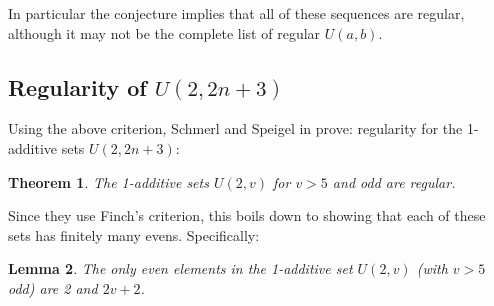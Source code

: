 \documentclass{report}
\newtheorem{theorem}{Theorem}[section]
\newtheorem{lemma}[theorem]{Lemma}
\theoremstyle{remark}
\numberwithin{equation}{section}
\begin{document}
In particular the conjecture implies that all of these sequences are
regular, although it may not be the complete list of regular $U(a,b)$.

\subsection{Regularity of $U(2,2n+3)$}

Using the above criterion, Schmerl and Speigel in
\cite{schmerl:jct1994} prove: regularity for the 1-additive sets
$U(2, 2n+3)$:

\begin{theorem}
The 1-additive sets $U(2,v)$ for $v > 5$ and odd are regular.
\end{theorem}

Since they use Finch's criterion, this boils down to showing that each
of these sets has finitely many evens.  Specifically: 

\begin{lemma}The only even elements in the 1-additive set $U(2,v)$
  (with $v > 5$ odd) are 2 and $2v+2$.
\end{lemma}
\end{document}
